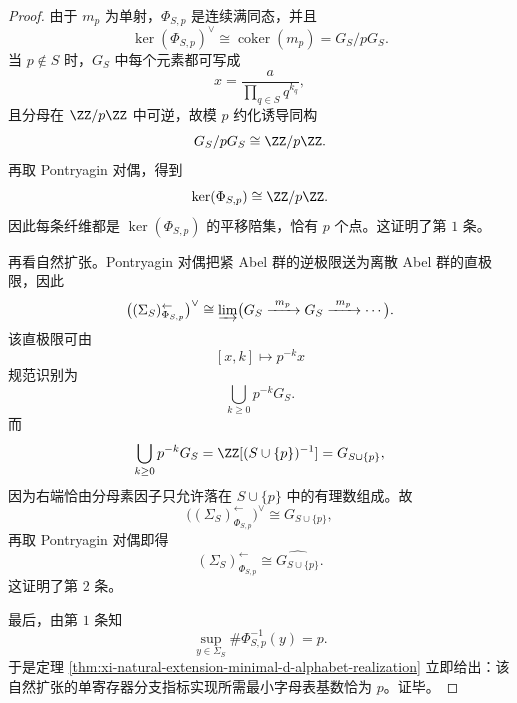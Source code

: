 \begin{proof}
由于 \(m_p\) 为单射，\(\Phi_{S,p}\) 是连续满同态，并且
\[
\ker(\Phi_{S,p})^\vee
\cong
\operatorname{coker}(m_p)
=
G_S/pG_S.
\]
当 \(p\notin S\) 时，\(G_S\) 中每个元素都可写成
\[
x=\frac{a}{\prod_{q\in S}q^{k_q}},
\]
且分母在 \(\ZZ/p\ZZ\) 中可逆，故模 \(p\) 约化诱导同构
\[
G_S/pG_S\cong \ZZ/p\ZZ.
\]
再取 Pontryagin 对偶，得到
\[
\ker(\Phi_{S,p})\cong \ZZ/p\ZZ.
\]
因此每条纤维都是 \(\ker(\Phi_{S,p})\) 的平移陪集，恰有 \(p\) 个点。这证明了第 \(1\) 条。

再看自然扩张。Pontryagin 对偶把紧 Abel 群的逆极限送为离散 Abel 群的直极限，因此
\[
\bigl((\Sigma_S)^{\leftarrow}_{\Phi_{S,p}}\bigr)^\vee
\cong
\varinjlim\bigl(
G_S\xrightarrow{\ m_p\ }G_S\xrightarrow{\ m_p\ }\cdots
\bigr).
\]
该直极限可由
\[
[x,k]\longmapsto p^{-k}x
\]
规范识别为
\[
\bigcup_{k\ge 0}p^{-k}G_S.
\]
而
\[
\bigcup_{k\ge 0}p^{-k}G_S
=
\ZZ[(S\cup\{p\})^{-1}]
=
G_{S\cup\{p\}},
\]
因为右端恰由分母素因子只允许落在 \(S\cup\{p\}\) 中的有理数组成。故
\[
\bigl((\Sigma_S)^{\leftarrow}_{\Phi_{S,p}}\bigr)^\vee
\cong
G_{S\cup\{p\}},
\]
再取 Pontryagin 对偶即得
\[
(\Sigma_S)^{\leftarrow}_{\Phi_{S,p}}
\cong
\widehat{G_{S\cup\{p\}}}.
\]
这证明了第 \(2\) 条。

最后，由第 \(1\) 条知
\[
\sup_{y\in\Sigma_S}\#\Phi_{S,p}^{-1}(y)=p.
\]
于是定理 \ref{thm:xi-natural-extension-minimal-d-alphabet-realization} 立即给出：该自然扩张的单寄存器分支指标实现所需最小字母表基数恰为 \(p\)。证毕。
\end{proof}


